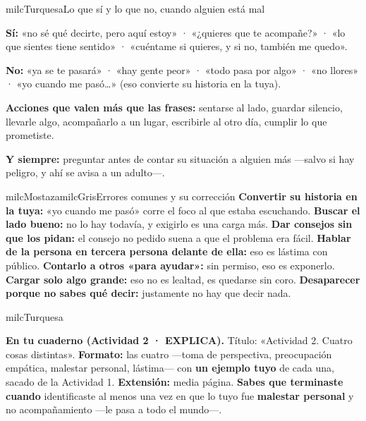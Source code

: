 \documentclass[11pt,letterpaper]{article}
\begin{document}
\begin{drawbox}{milcTurquesa}{Lo que sí y lo que no, cuando alguien está mal}
\begin{pasoslista}
\item \textbf{Sí:} «no sé qué decirte, pero aquí estoy» · «¿quieres que te acompañe?» · «lo que sientes tiene sentido» · «cuéntame si quieres, y si no, también me quedo».
\item \textbf{No:} «ya se te pasará» · «hay gente peor» · «todo pasa por algo» · «no llores» · «yo cuando me pasó\ldots» (eso convierte su historia en la tuya).
\item \textbf{Acciones que valen más que las frases:} sentarse al lado, guardar silencio, llevarle algo, acompañarlo a un lugar, escribirle al otro día, cumplir lo que prometiste.
\item \textbf{Y siempre:} preguntar antes de contar su situación a alguien más ---salvo si hay peligro, y ahí se avisa a un adulto---.
\end{pasoslista}
\end{drawbox}

\begin{softbox}{milcMostaza}{milcGris}{Errores comunes y su corrección}
\textbf{Convertir su historia en la tuya:} «yo cuando me pasó» corre el foco al que estaba escuchando. \textbf{Buscar el lado bueno:} no lo hay todavía, y exigirlo es una carga más. \textbf{Dar consejos sin que los pidan:} el consejo no pedido suena a que el problema era fácil. \textbf{Hablar de la persona en tercera persona delante de ella:} eso es lástima con público. \textbf{Contarlo a otros «para ayudar»:} sin permiso, eso es exponerlo. \textbf{Cargar solo algo grande:} eso no es lealtad, es quedarse sin coro. \textbf{Desaparecer porque no sabes qué decir:} justamente no hay que decir nada.
\end{softbox}

\begin{infoband}{milcTurquesa}


\textbf{En tu cuaderno (Actividad 2 · EXPLICA).} Título: «Actividad 2. Cuatro cosas distintas». \textbf{Formato:} las cuatro ---toma de perspectiva, preocupación empática, malestar personal, lástima--- con \textbf{un ejemplo tuyo} de cada una, sacado de la Actividad 1. \textbf{Extensión:} media página. \textbf{Sabes que terminaste cuando} identificaste al menos una vez en que lo tuyo fue \textbf{malestar personal} y no acompañamiento ---le pasa a todo el mundo---.
\end{infoband}
\end{document}
